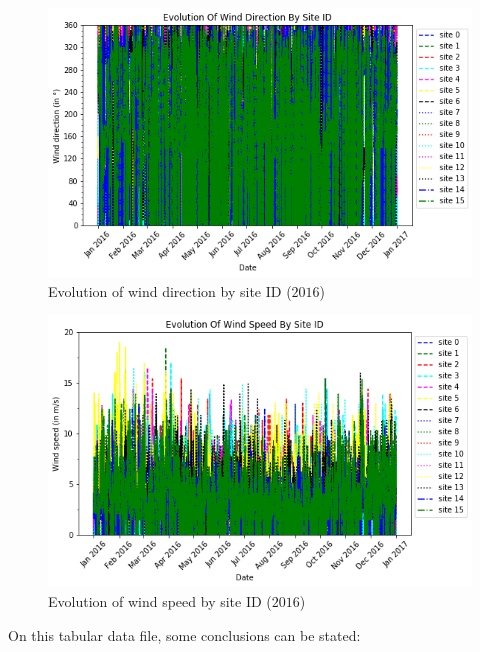 \documentclass[twocolumn, switch]{article}
\begin{document}
\begin{figure}[H]
\centering
\includegraphics[scale=0.35]{../graphs/evolution_wind_direction_by_site_id}
\caption{Evolution of wind direction by site ID ($2016$)}
\label{fig:evolution_wind_direction_by_site_id}
\end{figure}

\begin{figure}[H]
\centering
\includegraphics[scale=0.35]{../graphs/evolution_wind_speed_by_site_id}
\caption{Evolution of wind speed by site ID ($2016$)}
\label{fig:evolution_wind_speed_by_site_id}
\end{figure}

On this tabular data file, some conclusions can be stated:
\end{document}
